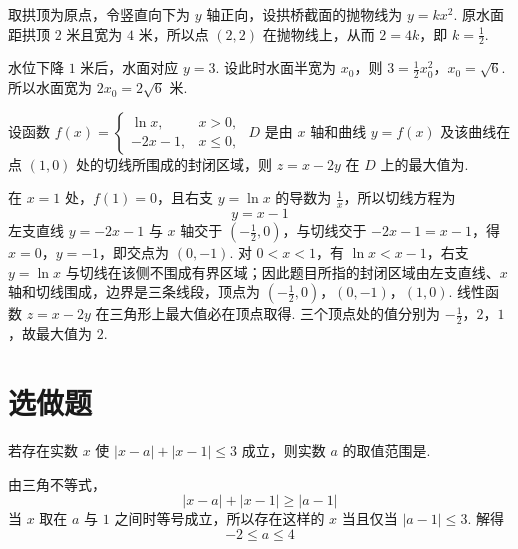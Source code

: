 
\begin{solution}
取拱顶为原点，令竖直向下为 \(y\) 轴正向，设拱桥截面的抛物线为 \(y=kx^2\). 原水面距拱顶 \(2\) 米且宽为 \(4\) 米，所以点 \((2,2)\) 在抛物线上，从而 \(2=4k\)，即 \(k=\frac{1}{2}\).

水位下降 \(1\) 米后，水面对应 \(y=3\). 设此时水面半宽为 \(x_0\)，则
\(3=\frac12x_0^2\)，\(x_0=\sqrt6\).
所以水面宽为 \(2x_0=2\sqrt6\) 米.
\end{solution}

\begin{problem}
设函数 \( f(x) = \begin{cases}
\ln x, & x > 0,\\
-2x - 1, & x \leqslant 0,
\end{cases} \) \(D\) 是由 \( x \) 轴和曲线 \( y = f(x) \) 及该曲线在点 \((1,0)\) 处的切线所围成的封闭区域，则 \( z = x - 2y \) 在 \(D\) 上的最大值为\fillinblank{}.
\end{problem}


\begin{solution}
在 \(x=1\) 处，\(f(1)=0\)，且右支 \(y=\ln x\) 的导数为 \(\frac{1}{x}\)，所以切线方程为
\[
y=x-1
\]
左支直线 \(y=-2x-1\) 与 \(x\) 轴交于 \(\left(-\frac12,0\right)\)，与切线交于 \(-2x-1=x-1\)，得 \(x=0\)，\(y=-1\)，即交点为 \((0,-1)\). 对 \(0<x<1\)，有 \(\ln x<x-1\)，右支 \(y=\ln x\) 与切线在该侧不围成有界区域；因此题目所指的封闭区域由左支直线、\(x\) 轴和切线围成，边界是三条线段，顶点为
\(\left(-\frac12,0\right)\)，\((0,-1)\)，\((1,0)\).
线性函数 \(z=x-2y\) 在三角形上最大值必在顶点取得. 三个顶点处的值分别为 \(-\frac{1}{2}\)，\(2\)，\(1\)，故最大值为 \(2\).
\end{solution}

\section{选做题}

\begin{problem}[A]
若存在实数 \(x\) 使 \(\left|x-a\right|+\left|x-1\right|\leqslant 3\) 成立，则实数 \(a\) 的取值范围是\fillinblank{}.
\end{problem}


\begin{solution}
由三角不等式，
\[
|x-a|+|x-1|\geqslant|a-1|
\]
当 \(x\) 取在 \(a\) 与 \(1\) 之间时等号成立，所以存在这样的 \(x\) 当且仅当 \(|a-1|\leqslant3\). 解得
\[
-2\leqslant a\leqslant4
\]
\end{solution}

